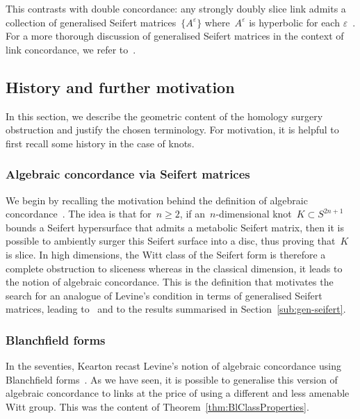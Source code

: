 \documentclass[10.9pt,a4paper]{amsart}
\theoremstyle{definition}
\theoremstyle{remark}
\begin{document}
This contrasts with double concordance:
any strongly doubly slice link admits a collection of generalised Seifert matrices~$\{A^\varepsilon\}$ where~$A^\varepsilon$ is hyperbolic for each $\varepsilon$~\cite[Theorem 1.13]{ConwayOrson}.
For a more thorough discussion of generalised Seifert matrices in the context of link concordance, we refer to~\cite{Simian,GaetanPhD}.


\subsection{History and further motivation}
\label{sub:History}

In this section, we describe the geometric content of the homology surgery obstruction and justify the chosen terminology.
For motivation, it is helpful to first recall some history in the case of knots.

\subsubsection*{Algebraic concordance via Seifert matrices}
We begin by recalling the motivation behind the definition of algebraic concordance~\cite{LevineKnotCob}.
The idea is that for~$n\ge 2$,  if an~$n$-dimensional knot~$K \subset S^{2n+1}$ bounds a Seifert hypersurface that admits a metabolic Seifert matrix, then it is possible to ambiently surger this Seifert surface into a disc, thus proving that~$K$ is slice. 
In high dimensions,  the Witt class of the Seifert form is therefore a complete obstruction to sliceness whereas in the classical dimension, it leads to the notion of algebraic concordance.
This is the definition that motivates the search for an analogue of Levine's condition in terms of generalised Seifert matrices, leading to~\cite{Simian} and to the results summarised in Section~\ref{sub:gen-seifert}.



\subsubsection*{Blanchfield forms}
In the seventies, Kearton recast Levine's notion of algebraic concordance using Blanchfield forms~\cite{KeartonCobordism}.
As we have seen,  it is possible to generalise this version of algebraic concordance to links at the price of using a different and less amenable Witt group.
This was the content of Theorem~\ref{thm:BlClassProperties}.
\end{document}
